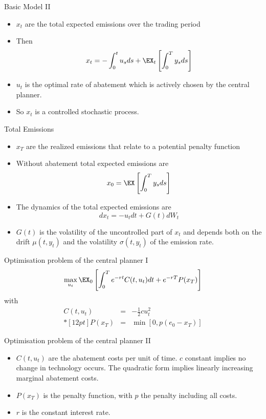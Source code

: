 {Basic Model II}
\begin{itemize}
\item<1-> $x_t$ are the total expected emissions over the trading period
\item<2-> Then
\begin{equation}
x_t=-\int_0^tu_s ds + \EX_t\left[\int_0^T y_s ds \right]
\end{equation}
\item<3-> $u_t$ is the optimal rate of abatement which is  actively chosen by the central planner.
\item<4-> So $x_t$ is a controlled stochastic process.
\end{itemize}



{Total Emissions}
\begin{itemize}
\item<1-> $x_T$ are the realized emissions that relate to a potential penalty function
\item<2-> Without abatement total expected emissions  are
$$
x_0=\EX\left[\int_0^T y_s ds \right]
$$
\item<3-> The dynamics of the total expected emissions are
\begin{equation}
dx_t=-u_t dt + G(t) dW_t
\end{equation}
\item<4-> $G(t)$ is the volatility of the uncontrolled part of $x_t$ and depends both on the drift $\mu(t, y_t)$
and the volatility $\sigma(t,y_t)$ of the emission rate.
\end{itemize}



{Optimisation problem of the central planner I}
\begin{equation}
\max_{u_t} \EX_0\left[\int_0^Te^{-rt}C(t,u_t)dt + e^{-rT}P(x_T)\right]
\end{equation}
with
$$
\begin{array}{lll}
C(t,u_t) &=& - \frac{1}{2}c u_t^2 \\*[12pt]
P(x_T) &=& \min[0,p(e_0-x_T)]
\end{array}
$$



{Optimisation problem of the central planner II}
\begin{itemize}
\item<1-> $C(t,u_t)$ are the abatement costs per unit of time. $c$ constant implies no change in technology occurs.
The quadratic form implies linearly increasing marginal abatement costs.
\item<2-> $P(x_T)$ is the penalty function, with $p$ the penalty including all costs.
\item<3-> $r$ is the constant interest rate.
\end{itemize}



